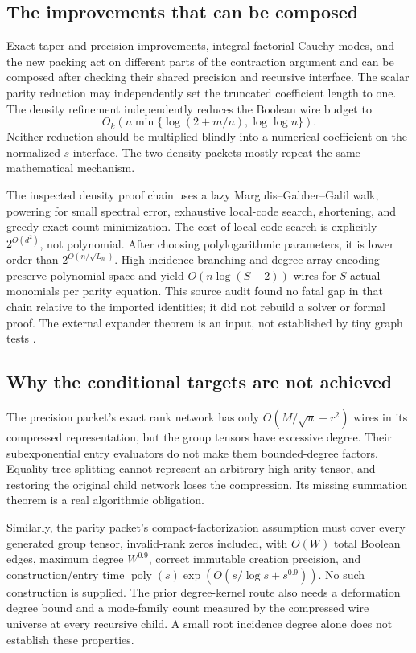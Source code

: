 \documentclass[11pt,letterpaper]{article}
\newcommand{\poly}{\operatorname{poly}}
\begin{document}
\subsection{The improvements that can be composed}
Exact taper and precision improvements, integral factorial-Cauchy modes, and the new packing
act on different parts of the contraction argument and can be composed after checking their
shared precision and recursive interface. The scalar parity reduction may independently set
the truncated coefficient length to one. The density refinement independently reduces the
Boolean wire budget to
\[
 O_k\!\left(n\min\{\log(2+m/n),\log\log n\}\right).
\]
Neither reduction should be multiplied blindly into a numerical coefficient on the normalized
$s$ interface. The two density packets mostly repeat the same mathematical mechanism.

The inspected density proof chain uses a lazy Margulis--Gabber--Galil walk, powering for small
spectral error, exhaustive local-code search, shortening, and greedy exact-count minimization.
The cost of local-code search is explicitly $2^{O(d^2)}$, not polynomial. After choosing
polylogarithmic parameters, it is lower order than $2^{O(n/\sqrt{L_n})}$.
High-incidence branching and degree-array encoding preserve polynomial space and yield
$O(n\log(S+2))$ wires for $S$ actual monomials per parity equation.
This source audit found no fatal gap in that chain relative to the imported identities;
it did not rebuild a solver or formal proof. The external expander theorem is an input,
not established by tiny graph tests \cite{mgg}.

\subsection{Why the conditional targets are not achieved}
The precision packet's exact rank network has only $O(M/\sqrt u+r^2)$ wires in its
compressed representation, but the group tensors have excessive degree. Their subexponential
entry evaluators do not make them bounded-degree factors. Equality-tree splitting cannot
represent an arbitrary high-arity tensor, and restoring the original child network loses
the compression. Its missing summation theorem is a real algorithmic obligation.

Similarly, the parity packet's compact-factorization assumption must cover every generated
group tensor, invalid-rank zeros included, with $O(W)$ total Boolean edges, maximum degree
$W^{0.9}$, correct immutable creation precision, and construction/entry time
$\poly(s)\exp(O(s/\log s+s^{0.9}))$. No such construction is supplied.
The prior degree-kernel route also needs a deformation degree bound and a mode-family
count measured by the compressed wire universe at every recursive child. A small root
incidence degree alone does not establish these properties.
\end{document}
